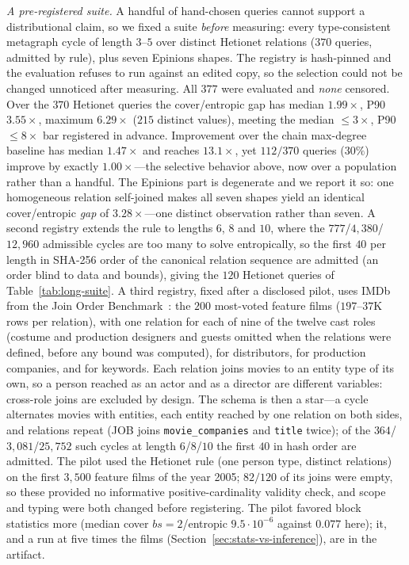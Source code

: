 \documentclass[sigconf, nonacm, acmthm=false]{acmart}
\begin{document}
\emph{A pre-registered suite.}\label{sec:suite} A handful of hand-chosen queries cannot
support a distributional claim, so we fixed a suite \emph{before}
measuring: every type-consistent metagraph cycle of length $3$--$5$ over
distinct Hetionet relations ($370$ queries, admitted by rule), plus seven
Epinions shapes. The registry is hash-pinned and the evaluation refuses
to run against an edited copy, so the selection could not be changed unnoticed after measuring. All $377$ were evaluated and \emph{none} censored. Over the
$370$ Hetionet queries the cover/entropic gap has median $1.99\times$,
P90 $3.55\times$, maximum $6.29\times$ ($215$ distinct values), meeting
the median ${\le}3\times$, P90 ${\le}8\times$ bar registered in advance.
Improvement over the chain max-degree baseline has median $1.47\times$ and reaches
$13.1\times$, yet $112/370$ queries ($30\%$) improve by exactly
$1.00\times$---the selective behavior above, now over a population
rather than a handful. The Epinions part is degenerate and we report it
so: one homogeneous relation self-joined makes all seven shapes yield an
identical cover/entropic \emph{gap} of $3.28\times$---one distinct
observation rather than seven. A second registry extends the rule to
lengths $6$, $8$ and $10$, where the $777$/$4{,}380$/$12{,}960$ admissible
cycles are too many to solve entropically, so the first $40$ per length in
SHA-256 order of the canonical relation sequence are admitted (an order
blind to data and bounds), giving the $120$ Hetionet queries of
Table~\ref{tab:long-suite}. A third registry, fixed after a disclosed
pilot, uses IMDb from the Join Order Benchmark~\cite{leis2015goodare}:
the $200$ most-voted feature films ($197$--$37$K rows per relation), with
one relation for each of nine of the twelve cast roles (costume and
production designers and guests omitted when the relations were defined,
before any bound was computed), for distributors, for
production companies, and for keywords. Each relation joins movies to an
entity type of its own, so a person reached as an actor and as a director
are different variables: cross-role joins are excluded by design. The
schema is then a star---a cycle alternates movies with entities, each
entity reached by one relation on both sides, and relations repeat (JOB
joins \texttt{movie\_companies} and \texttt{title} twice); of the
$364$/$3{,}081$/$25{,}752$ such cycles at length $6$/$8$/$10$ the first
$40$ in hash order are admitted. The pilot used the Hetionet rule (one
person type, distinct relations) on the first $3{,}500$ feature films of
the year 2005; $82/120$ of its joins were empty, so these provided no informative positive-cardinality validity check, and scope and typing were both changed before registering. The
pilot favored block statistics more (median cover $bs{=}2$/entropic
$9.5{\cdot}10^{-6}$ against $0.077$ here); it, and a run at five times
the films (Section~\ref{sec:stats-vs-inference}), are in the artifact.
\end{document}
